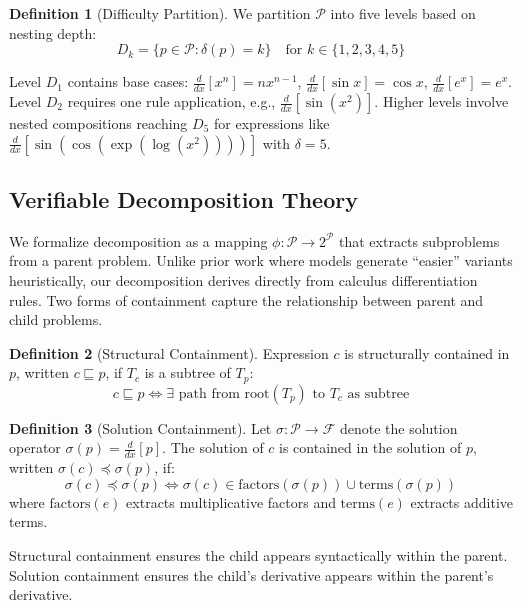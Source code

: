 \documentclass[a4paper,fleqn]{cas-dc}
\theoremstyle{definition}
\newtheorem{definition}{Definition}
\begin{document}
\begin{definition}[Difficulty Partition]
\label{def:difficulty}
We partition $\mathcal{P}$ into five levels based on nesting depth:
\begin{equation}
D_k = \{p \in \mathcal{P} : \delta(p) = k\} \quad \text{for } k \in \{1, 2, 3, 4, 5\}
\end{equation}
\end{definition}

\noindent
Level $D_1$ contains base cases: $\frac{d}{dx}[x^n] = nx^{n-1}$, $\frac{d}{dx}[\sin x] = \cos x$, $\frac{d}{dx}[e^x] = e^x$. Level $D_2$ requires one rule application, e.g., $\frac{d}{dx}[\sin(x^2)]$. Higher levels involve nested compositions reaching $D_5$ for expressions like $\frac{d}{dx}[\sin(\cos(\exp(\log(x^2))))]$ with $\delta = 5$.

\subsection{Verifiable Decomposition Theory}
\label{sec:decomposition}
We formalize decomposition as a mapping $\phi: \mathcal{P} \rightarrow 2^{\mathcal{P}}$ that extracts subproblems from a parent problem. Unlike prior work where models generate ``easier'' variants heuristically, our decomposition derives directly from calculus differentiation rules. Two forms of containment capture the relationship between parent and child problems.

\begin{definition}[Structural Containment]
\label{def:containment}
Expression $c$ is structurally contained in $p$, written $c \sqsubseteq p$, if $T_c$ is a subtree of $T_p$:
\begin{equation}
c \sqsubseteq p \iff \exists \text{ path from root}(T_p) \text{ to } T_c \text{ as subtree}
\end{equation}
\end{definition}

\begin{definition}[Solution Containment]
\label{def:solution_containment}
Let $\sigma: \mathcal{P} \rightarrow \mathcal{F}$ denote the solution operator $\sigma(p) = \frac{d}{dx}[p]$. The solution of $c$ is contained in the solution of $p$, written $\sigma(c) \preceq \sigma(p)$, if:
\begin{equation}
\sigma(c) \preceq \sigma(p) \iff \sigma(c) \in \text{factors}(\sigma(p)) \cup \text{terms}(\sigma(p))
\end{equation}
where $\text{factors}(e)$ extracts multiplicative factors and $\text{terms}(e)$ extracts additive terms.
\end{definition}
Structural containment ensures the child appears syntactically within the parent. Solution containment ensures the child's derivative appears within the parent's derivative.
\end{document}
